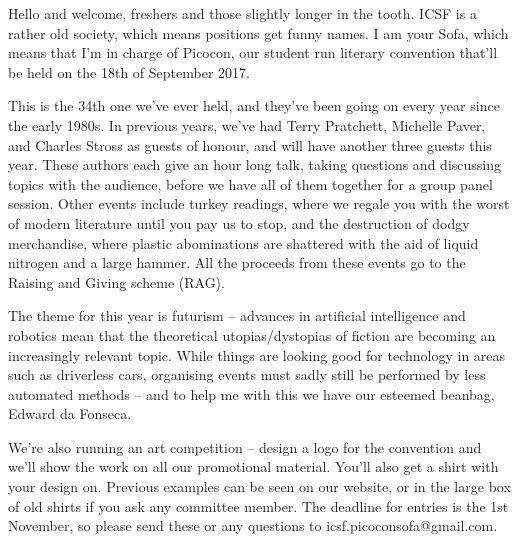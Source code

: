 Hello and welcome, freshers and those slightly longer in the tooth. ICSF is a rather old society, which means positions get funny names. I am your Sofa, which means that I’m in charge of Picocon, our student run literary convention that’ll be held on the 18th of September 2017. 

This is the 34th one we’ve ever held, and they’ve been going on every year since the early 1980s.  In previous years, we’ve had Terry Pratchett, Michelle Paver, and Charles Stross as guests of honour, and will have another three guests this year. These authors each give an hour long talk, taking questions and discussing topics with the audience, before we have all of them together for a group panel session. Other events include turkey readings, where we regale you with the worst of modern literature until you pay us to stop, and the destruction of dodgy merchandise, where plastic abominations are shattered with the aid of liquid nitrogen and a large hammer. All the proceeds from these events go to the Raising and Giving scheme (RAG).  

The theme for this year is futurism – advances in artificial intelligence and robotics mean that the theoretical utopias/dystopias of fiction are becoming an increasingly relevant topic. While things are looking good for technology in areas such as driverless cars, organising events must sadly still be performed by less automated methods – and to help me with this we have our esteemed beanbag, Edward da Fonseca. 

We’re also running an art competition – design a logo for the convention and we’ll show the work on all our promotional material. You’ll also get a shirt with your design on. Previous examples can be seen on our website, or in the large box of old shirts if you ask any committee member. The deadline for entries is the 1st November, so please send these or any questions to icsf.picoconsofa@gmail.com. 